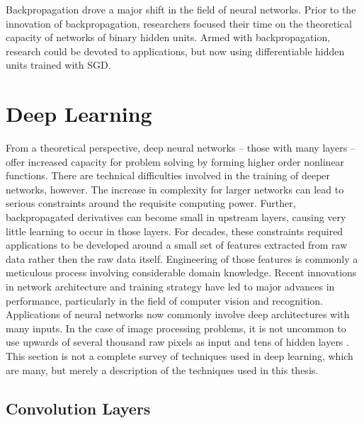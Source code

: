 Backpropagation drove a major shift in the field of neural networks.  Prior to the innovation of backpropagation, researchers focused their time on the theoretical capacity of networks of binary hidden units.  Armed with backpropagation, research could be devoted to applications, but now using differentiable hidden units trained with SGD.


\section{Deep Learning}
\label{deeplearning}

From a theoretical perspective, deep neural networks -- those with many layers -- offer increased capacity for problem solving by forming higher order nonlinear functions.  There are technical difficulties involved in the training of deeper networks, however.  The increase in complexity for larger networks can lead to serious constraints around the requisite computing power.  Further, backpropagated derivatives can become small in upstream layers, causing very little learning to occur in those layers.  For decades, these constraints required applications to be developed around a small set of features extracted from raw data rather then the raw data itself.  Engineering of those features is commonly a meticulous process involving considerable domain knowledge.  Recent innovations in network architecture and training strategy have led to major advances in performance, particularly in the field of computer vision and recognition.
Applications of neural networks now commonly involve deep architectures with many inputs.
In the case of image processing problems, it is not uncommon to use upwards of several thousand raw pixels as input and tens of hidden layers \cite{lecun2015deep}.
This section is not a complete survey of techniques used in deep learning, which are many, but merely a description of the techniques used in this thesis.

\subsection{Convolution Layers}

